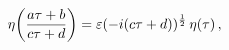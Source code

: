 \[\mathop{\eta\/}\nolimits\!\left(\frac{a\tau+b}{c\tau+d}\right)=\varepsilon(-i(%
c\tau+d))^{\frac{1}{2}}\mathop{\eta\/}\nolimits\!\left(\tau\right),\]